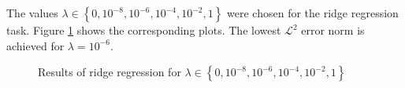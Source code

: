 The values $\lambda\in\left\{ 0,10^{-8},10^{-6},10^{-4},10^{-2},1\right\} $
were chosen for the ridge regression task. Figure \ref{fig:ridge-regression}
shows the corresponding plots. The lowest $\mathcal{L}^{2}$ error
norm is achieved for $\lambda=10^{-6}$.

\begin{figure}
\centering{}\hfill{}\hfill{}\hfill{}\caption{Results of ridge regression for $\lambda\in\left\{ 0,10^{-8},10^{-6},10^{-4},10^{-2},1\right\} $\label{fig:ridge-regression}}
\end{figure}
